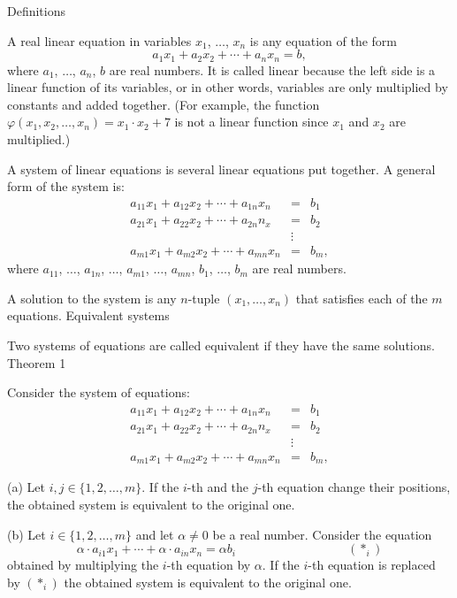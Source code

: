 Definitions

A real linear equation in variables \( x_1 \), \( \dots \), \( x_n \) is any equation of the form \[ a_1x_1+a_2x_2+\cdots+a_nx_n=b,\] where \( a_1 \), \( \dots \), \( a_n \), \( b \) are real numbers. It is called linear because the left side is a linear function of its variables, or in other words, variables are only multiplied by constants and added together. (For example, the function \( \varphi(x_1,x_2,\dots, x_n)=x_1\cdot x_2+7 \) is not a linear function since \( x_1 \) and \( x_2 \) are multiplied.)

A system of linear equations is several linear equations put together. A general form of the system is: \begin{eqnarray*} a_{11}x_1+a_{12}x_2+\cdots+a_{1n}x_n&=&b_1\\ a_{21}x_1+a_{22}x_2+\cdots+a_{2n}n_x&=&b_2\\ &\vdots&\\ a_{m1}x_1+a_{m2}x_2+\cdots+a_{mn}x_n&=&b_m, \end{eqnarray*} where \( a_{11} \), \( \dots \), \( a_{1n} \), \( \dots \), \( a_{m1} \), \( \dots \), \( a_{mn} \), \( b_1 \), \( \dots \), \( b_m \) are real numbers.

A solution to the system is any \( n \)-tuple \( (x_1, \dots, x_n) \) that satisfies each of the \( m \) equations.
Equivalent systems

Two systems of equations are called equivalent if they have the same solutions.
Theorem 1


Consider the system of equations: \begin{eqnarray*} a_{11}x_1+a_{12}x_2+\cdots+a_{1n}x_n&=&b_1\\ a_{21}x_1+a_{22}x_2+\cdots+a_{2n}n_x&=&b_2\\ &\vdots&\\ a_{m1}x_1+a_{m2}x_2+\cdots+a_{mn}x_n&=&b_m, \end{eqnarray*}

    (a) Let \( i,j\in\{1,2,\dots, m\} \). If the \( i \)-th and the \( j \)-th equation change their positions, the obtained system is equivalent to the original one.

    (b) Let \( i\in\{1,2,\dots, m\} \) and let \( \alpha\neq 0 \) be a real number. Consider the equation \[ \alpha\cdot a_{i1}x_1+\cdots+\alpha\cdot a_{in}x_n=\alpha b_i\quad\quad\quad\quad\quad\quad\quad\quad\quad (\ast_i)\] obtained by multiplying the \( i \)-th equation by \( \alpha \). If the \( i \)-th equation is replaced by \( (\ast_i) \) the obtained system is equivalent to the original one.

